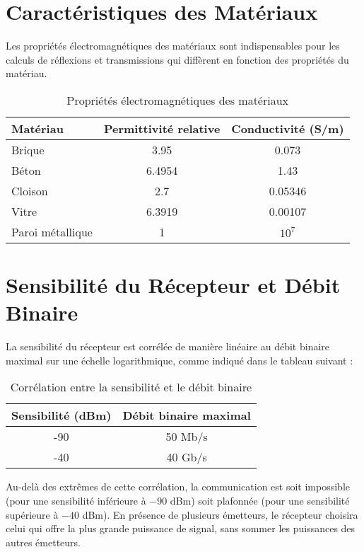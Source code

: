 \section{Caractéristiques des Matériaux}
Les propriétés électromagnétiques des matériaux sont indispensables pour les calculs de réflexions et transmissions qui diffèrent en fonction des propriétés du matériau.

\begin{table}[h]
\centering
\begin{tabular}{|l|c|c|}
\hline
\textbf{Matériau} & \textbf{Permittivité relative} & \textbf{Conductivité (S/m)} \\ \hline
Brique           & 3.95                           & 0.073                      \\ \hline
Béton            & 6.4954                         & 1.43                       \\ \hline
Cloison          & 2.7                            & 0.05346                    \\ \hline
Vitre            & 6.3919                         & 0.00107                    \\ \hline
Paroi métallique & 1                              & $10^7$                        \\ \hline
\end{tabular}
\caption{Propriétés électromagnétiques des matériaux}
\label{tab:material-properties}
\end{table}

\section{Sensibilité du Récepteur et Débit Binaire}
La sensibilité du récepteur est corrélée de manière linéaire au débit binaire maximal sur une échelle logarithmique, comme indiqué dans le tableau suivant :
\begin{table}[h]
\centering
\begin{tabular}{|c|c|}
\hline
\textbf{Sensibilité (dBm)} & \textbf{Débit binaire maximal} \\
\hline
-90 & 50 Mb/s \\
-40 & 40 Gb/s \\
\hline
\end{tabular}
\caption{Corrélation entre la sensibilité et le débit binaire}
\label{tab:sensitivity}
\end{table}

Au-delà des extrêmes de cette corrélation, la communication est soit impossible (pour une sensibilité inférieure à \(-90\) dBm) soit plafonnée (pour une sensibilité supérieure à \(-40\) dBm). En présence de plusieurs émetteurs, le récepteur choisira celui qui offre la plus grande puissance de signal, sans sommer les puissances des autres émetteurs.

